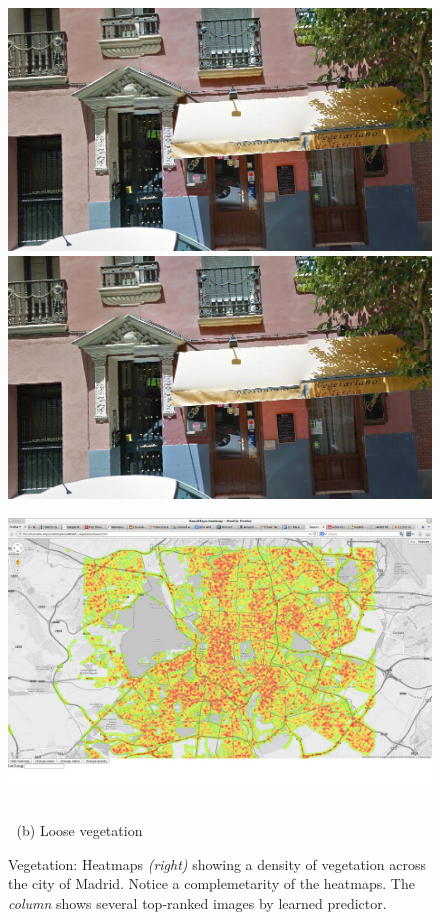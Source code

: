 \documentclass[runningheads]{llncs}
\begin{document}
\begin{figure}
\begin{minipage}{\linewidth}
\begin{minipage}{0.3\linewidth}
      \\ \vspace{-3mm} \\
      \includegraphics[width=0.49\linewidth]{imgs/cutout_pitch04.jpg}
      \includegraphics[width=0.49\linewidth]{imgs/cutout_pitch04.jpg}
    \end{minipage}
    \begin{minipage}{0.7\linewidth}
      \includegraphics[trim= 350 150 250 150, clip=true, width=\linewidth]{imgs/vege/mapT1.jpg}
    \end{minipage}
  \end{minipage}
  \\
  $\;$\hspace{30mm} (b) Loose vegetation
  \\
  \caption{
    Vegetation: Heatmaps \emph{(right)} showing a density of vegetation across the city of Madrid. Notice a complemetarity of the heatmaps. The \emph{column} shows several top-ranked images by learned predictor.
  }
\end{figure}





\end{document}
